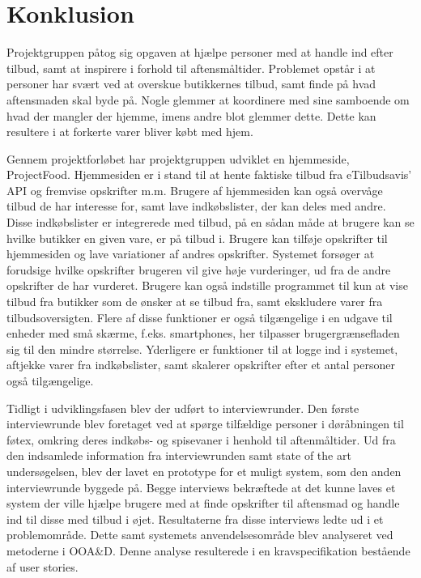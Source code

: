 \chapter{Konklusion}

Projektgruppen påtog sig opgaven at hjælpe personer med at handle ind efter tilbud, samt at inspirere i forhold til aftensmåltider.
Problemet opstår i at personer har svært ved at overskue butikkernes tilbud, samt finde på hvad aftensmaden skal byde på.
Nogle glemmer at koordinere med sine samboende om hvad der mangler der hjemme, imens andre blot glemmer dette.
Dette kan resultere i at forkerte varer bliver købt med hjem.


Gennem projektforløbet har projektgruppen udviklet en hjemmeside, ProjectFood. 
Hjemmesiden er i stand til at hente faktiske tilbud fra eTilbudsavis’ API og fremvise opskrifter m.m. 
Brugere af hjemmesiden kan også overvåge tilbud de har interesse for, samt lave indkøbslister, der kan deles med andre. Disse indkøbslister er integrerede med tilbud, på en sådan måde at brugere kan se hvilke butikker en given vare, er på tilbud i. Brugere kan tilføje opskrifter til hjemmesiden og lave variationer af andres opskrifter. 
Systemet forsøger at forudsige hvilke opskrifter brugeren vil give høje vurderinger, ud fra de andre opskrifter de har vurderet. 
Brugere kan også indstille programmet til kun at vise tilbud fra butikker som de ønsker at se tilbud fra, samt ekskludere varer fra tilbudsoversigten.
Flere af disse funktioner er også tilgængelige i en udgave til enheder med små skærme, f.eks. smartphones, her tilpasser brugergrænsefladen sig til den mindre størrelse.
Yderligere er funktioner til at logge ind i systemet, aftjekke varer fra indkøbslister, samt skalerer opskrifter efter et antal personer også tilgængelige. 

Tidligt i udviklingsfasen blev der udført to interviewrunder.  
Den første interviewrunde blev foretaget ved at spørge tilfældige personer i døråbningen til føtex, omkring deres indkøbs- og spisevaner i henhold til aftenmåltider.
Ud fra den indsamlede information fra interviewrunden samt state of the art undersøgelsen, blev der lavet en prototype for et muligt system, som den anden interviewrunde byggede på. 
Begge interviews bekræftede at det kunne laves et system der ville hjælpe brugere med at finde opskrifter til aftensmad og handle ind til disse med tilbud i øjet.  
Resultaterne fra disse interviews ledte ud i et problemområde.
Dette samt systemets anvendelsesområde blev analyseret ved metoderne i OOA\&D.
Denne analyse resulterede i en kravspecifikation bestående af user stories.

